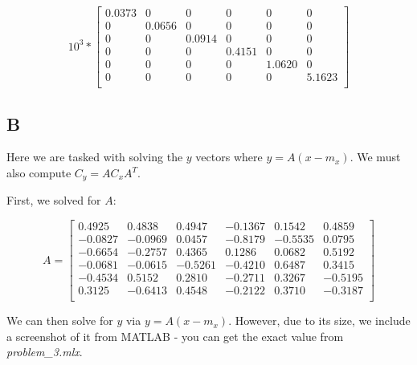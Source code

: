 \documentclass{article}
\begin{document}
\begin{equation}
    10^3 * 
    \begin{bmatrix}
        0.0373    &     0     &    0  &       0    &     0 &        0 \\
        0  &  0.0656    &     0     &    0    &     0   &      0 \\
        0    &     0  &  0.0914       &  0       &  0      &   0 \\
        0     &    0  &       0  &  0.4151    &     0  &       0 \\
        0      &   0   &      0   &      0   & 1.0620   &      0 \\
        0     &    0      &   0    &     0     &    0   & 5.1623 \\
    \end{bmatrix}
\end{equation}

\subsection*{B}

Here we are tasked with solving the $y$ vectors where $y = A(x-m_x)$. We must also compute $C_y = A C_x A^T$.

\noindent First, we solved for $A$:

\begin{equation}
    A = 
    \begin{bmatrix}    
        0.4925 &    0.4838 &    0.4947 &   -0.1367 &    0.1542 &    0.4859 \\
        -0.0827 &   -0.0969 &    0.0457 &   -0.8179 &   -0.5535 &    0.0795 \\
        -0.6654 &   -0.2757 &    0.4365 &    0.1286 &    0.0682 &    0.5192 \\
        -0.0681 &   -0.0615 &   -0.5261 &   -0.4210 &    0.6487 &    0.3415 \\
        -0.4534 &    0.5152 &    0.2810 &   -0.2711 &    0.3267 &   -0.5195 \\
        0.3125 &   -0.6413 &    0.4548 &   -0.2122 &    0.3710 &   -0.3187 \\
    \end{bmatrix}
\end{equation}

\noindent We can then solve for $y$ via $y=A(x-m_x)$. However, due to its size, we include a screenshot of it from MATLAB - you can get the exact value from \textit{problem\_3.mlx}.
\end{document}
